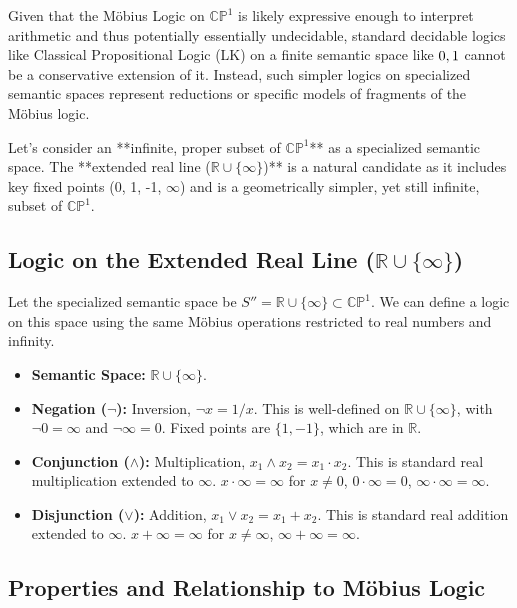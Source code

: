 	Given that the M\"{o}bius Logic on $\mathbb{CP}^1$ is likely expressive enough to interpret arithmetic and thus potentially essentially undecidable, standard decidable logics like Classical Propositional Logic (LK) on a finite semantic space like $\\{0, 1\\}$ cannot be a conservative extension of it. Instead, such simpler logics on specialized semantic spaces represent reductions or specific models of fragments of the M\"{o}bius logic.
	
	Let's consider an **infinite, proper subset of $\mathbb{CP}^1$** as a specialized semantic space. The **extended real line ($\mathbb{R} \cup \{\infty\}$)** is a natural candidate as it includes key fixed points (0, 1, -1, $\infty$) and is a geometrically simpler, yet still infinite, subset of $\mathbb{CP}^1$.
	
	\subsection{Logic on the Extended Real Line ($\mathbb{R} \cup \{\infty\}$)}
	
	Let the specialized semantic space be $S'' = \mathbb{R} \cup \{\infty\} \subset \mathbb{CP}^1$. We can define a logic on this space using the same M\"{o}bius operations restricted to real numbers and infinity.
	
	\begin{itemize}
		\item \textbf{Semantic Space:} $\mathbb{R} \cup \{\infty\}$.
		\item \textbf{Negation ($\neg$):} Inversion, $\neg x = 1/x$. This is well-defined on $\mathbb{R} \cup \{\infty\}$, with $\neg 0 = \infty$ and $\neg \infty = 0$. Fixed points are $\{1, -1\}$, which are in $\mathbb{R}$.
		\item \textbf{Conjunction ($\wedge$):} Multiplication, $x_1 \wedge x_2 = x_1 \cdot x_2$. This is standard real multiplication extended to $\infty$. $x \cdot \infty = \infty$ for $x \neq 0$, $0 \cdot \infty = 0$, $\infty \cdot \infty = \infty$.
		\item \textbf{Disjunction ($\vee$):} Addition, $x_1 \vee x_2 = x_1 + x_2$. This is standard real addition extended to $\infty$. $x + \infty = \infty$ for $x \neq \infty$, $\infty + \infty = \infty$.
	\end{itemize}
	
	\subsection{Properties and Relationship to Möbius Logic}
	
